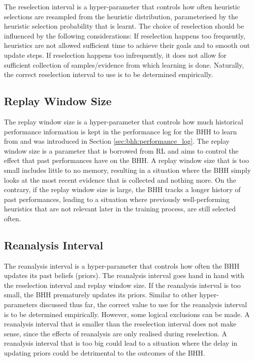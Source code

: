 The reselection interval is a hyper-parameter that controls how often heuristic selections are resampled from the heuristic distribution, parameterised by the heuristic selection probability that is learnt. The choice of reselection should be influenced by the following considerations: If reselection happens too frequently, heuristics are not allowed sufficient time to achieve their goals and to smooth out update steps. If reselection happens too infrequently, it does not allow for sufficient collection of samples/evidence from which learning is done. Naturally, the correct reselection interval to use is to be determined empirically.

\subsection{Replay Window Size}\label{sec:bhh:hyper_parameters:replay}

The replay window size is a hyper-parameter that controls how much historical performance information is kept in the performance log for the \acs{BHH} to learn from and was introduced in Section \ref{sec:bhh:performance_log}. The replay window size is a parameter that is borrowed from \acf{RL} and aims to control the effect that past performances have on the \acs{BHH}. A replay window size that is too small includes little to no memory, resulting in a situation where the \acs{BHH} simply looks at the most recent evidence that is collected and nothing more. On the contrary, if the replay window size is large, the \acs{BHH} tracks a longer history of past performances, leading to a situation where previously well-performing heuristics that are not relevant later in the training process, are still selected often.

\subsection{Reanalysis Interval}\label{sec:bhh:hyper_parameters:reanalysis}

The reanalysis interval is a hyper-parameter that controls how often the \acs{BHH} updates its past beliefs (priors). The reanalysis interval goes hand in hand with the reselection interval and replay window size. If the reanalysis interval is too small, the \acs{BHH} prematurely updates its priors. Similar to other hyper-parameters discussed thus far, the correct value to use for the reanalysis interval is to be determined empirically. However, some logical exclusions can be made. A reanalysis interval that is smaller than the reselection interval does not make sense, since the effects of reanalysis are only realised during reselection. A reanalysis interval that is too big could lead to a situation where the delay in updating priors could be detrimental to the outcomes of the \acs{BHH}.

